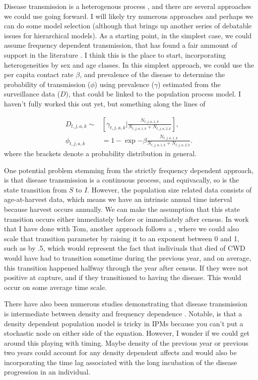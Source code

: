 \documentclass[12pt]{article}\usepackage[]{graphicx}\usepackage[]{color}
\begin{document}
Disease transmission is a heterogenous process \citep{samuel2016,grear2006}, and there are several approaches we could use going forward. I will likely try numerous approaches and perhaps we can do some model selection (although that brings up another series of debatable issues for hierarchical models). As a starting point, in the simplest case, we could assume frequency dependent transmission, that has found a fair ammount of support in the literature \citep{miller2008,potapov2012,miller2006,jennelle2014}. I think this is the place to start, incorporating heterogeneities by sex and age classes. In this simplest approach, we could use the per capita contact rate $\beta$, and prevalence of the disease to determine the probability of transmission ($\phi$) using prevalence ($\gamma$) estimated from the surveillance data ($D$), that could be linked to the population process model. I haven't fully worked this out yet, but something along the lines of

\begin{align}
D_{t,j,a,k} \sim & \left[\gamma_{t,j,a,k} | \frac{N_{t,j,a,1,k}}{N_{t,j,a,1,k}+N_{t,j,a,2,k}}\right],\\
\phi_{t,j,a,k} &  = 1-\exp{-\beta \frac{N_{t,j,a,1,k}}{N_{t,j,a,1,k}+N_{t,j,a,2,k}}}.
\end{align}
\noindent where the brackets denote a probability distribution in general.

One potential problem stemming from the strictly frequency dependent approach, is that 
disease transmission is a continuous process, and equivacally, so is 
the state transition from $S$ to $I$. However, the population size related data consists of age-at-harvest 
data, which means we have an intrinsic annual time interval because harvest occurs annually. We can make the assumption that this 
state transition occurs either immediately before or immediately after census. In work that I have done 
with Tom, another approach follows a \citet{noon1992}, where we could also scale that transition parameter 
by raising it to an exponent between 0 and 1, such as by .5, which would represent the fact that indiviuals 
that died of CWD would have had to transition sometime during the previous year, and on average, this 
transition happened halfway through the year after census. If they were not positive at capture, and if 
they transitioned to having the disease. This would occur on some average time scale.

There have also been numerous studies demonstrating that disease transmission is intermediate between density and frequency dependence \citep{almberg2011,ryder2007a,storm2013, cross2013, oraby2014}. Notable, is that a density dependent population model is tricky in IPMs because you can't put a stochastic node on either side of the equation. However, I wonder if we could get around this playing with timing. Maybe density of the previous year or previous two years could account for any density dependent affects and would also be incorporating the time lag associated with the long incubation of the disease progression in an individual. 
\end{document}
